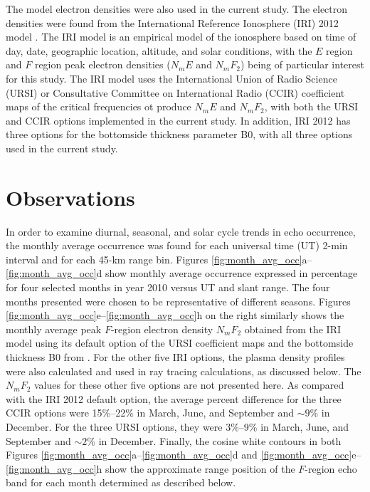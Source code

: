 The model electron densities were also used in the current study. The electron densities were found from the International Reference Ionosphere (IRI) 2012 model \citep{Bilitza2014}. The IRI model is an empirical model of the ionosphere based on time of day, date, geographic location, altitude, and solar conditions, with the \(E\) region and \(F\) region peak electron densities (\(N_m E\) and \(N_m F_2\)) being of particular interest for this study.  The IRI model uses the International Union of Radio Science (URSI) or Consultative Committee on International Radio (CCIR) coefficient maps of the critical frequencies ot produce \(N_m E\) and \(N_m F_2\), with both the URSI and CCIR options implemented in the current study.  In addition, IRI 2012 has three options for the bottomside thickness parameter B0, with all three options used in the current study.



\section{Observations}
\label{sec:p1observations}

In order to examine diurnal, seasonal, and solar cycle trends in echo occurrence, the monthly average occurrence was found for each universal time (UT) 2-min interval and for each 45-km range bin. Figures \ref{fig:month_avg_occ}a--\ref{fig:month_avg_occ}d show monthly average occurrence expressed in percentage for four selected months in year 2010 versus UT and slant range. The four months presented were chosen to be representative of different seasons. Figures \ref{fig:month_avg_occ}e--\ref{fig:month_avg_occ}h on the right similarly shows the monthly average peak \(F\)-region electron density \(N_mF_2\) obtained from the IRI model using its default option of the URSI coefficient maps and the bottomside thickness B0 from \citet{Altadill2009}.  For the other five IRI options, the plasma density profiles were also calculated and used in ray tracing calculations, as discussed below.  The \(N_mF_2\) values for these other five options are not presented here.  As compared with the IRI 2012 default option, the average percent difference for the three CCIR options were 15\%--22\% in March, June, and September and \(\sim9\)\% in December.  For the three URSI options, they were 3\%--9\% in March, June, and September and \(\sim2\)\% in December.  Finally, the cosine white contours in both Figures \ref{fig:month_avg_occ}a--\ref{fig:month_avg_occ}d and \ref{fig:month_avg_occ}e--\ref{fig:month_avg_occ}h show the approximate range position of the \(F\)-region echo band for each month determined as described below.
	
